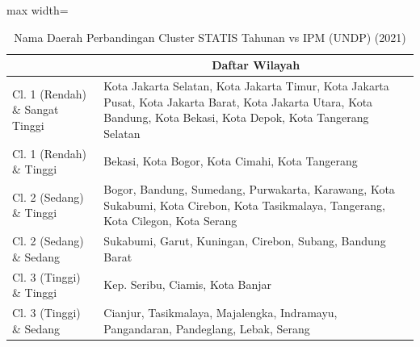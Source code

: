 \begin{table}[H]
\centering
\caption{Nama Daerah Perbandingan Cluster STATIS Tahunan vs IPM (UNDP) (2021)} \label{tab:app2statis_ipm_name_2021}
\begin{adjustbox}{max width=\textwidth}
\begin{tabular}{|>{\centering\arraybackslash}p{4cm}|p{10cm}|}
\hline
\multicolumn{1}{|c|}{\textbf{Kategori}} & \multicolumn{1}{c|}{\textbf{Daftar Wilayah}} \\
\hline
Cl. 1 (Rendah) \& Sangat Tinggi & Kota Jakarta Selatan, Kota Jakarta Timur, Kota Jakarta Pusat, Kota Jakarta Barat, Kota Jakarta Utara, Kota Bandung, Kota Bekasi, Kota Depok, Kota Tangerang Selatan \\
\hline
Cl. 1 (Rendah) \& Tinggi & Bekasi, Kota Bogor, Kota Cimahi, Kota Tangerang \\
\hline
Cl. 2 (Sedang) \& Tinggi & Bogor, Bandung, Sumedang, Purwakarta, Karawang, Kota Sukabumi, Kota Cirebon, Kota Tasikmalaya, Tangerang, Kota Cilegon, Kota Serang \\
\hline
Cl. 2 (Sedang) \& Sedang & Sukabumi, Garut, Kuningan, Cirebon, Subang, Bandung Barat \\
\hline
Cl. 3 (Tinggi) \& Tinggi & Kep. Seribu, Ciamis, Kota Banjar \\
\hline
Cl. 3 (Tinggi) \& Sedang & Cianjur, Tasikmalaya, Majalengka, Indramayu, Pangandaran, Pandeglang, Lebak, Serang \\
\hline
\end{tabular}
\end{adjustbox}
\end{table}